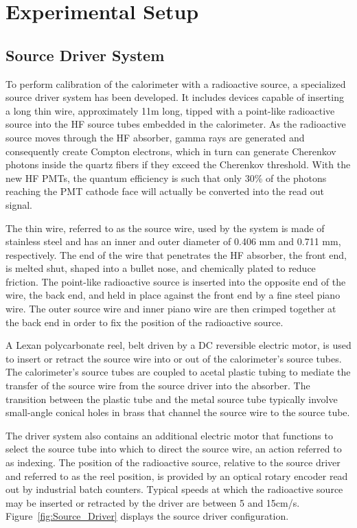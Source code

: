 \section{Experimental Setup}

\subsection{Source Driver System}
To perform calibration of the calorimeter with a radioactive source, a
specialized source driver system has been developed. It includes devices capable of
inserting a long thin wire, approximately 11\unit{m} long, tipped with a point-like
radioactive source into the HF source tubes embedded in the calorimeter. As the
radioactive source moves through the HF absorber, gamma rays are generated and
consequently create Compton electrons, which in turn can generate
Cherenkov photons inside the quartz fibers if they exceed the Cherenkov threshold.
With the new HF PMTs, the quantum efficiency is such that only 30\% of the photons
reaching the PMT cathode face will actually be converted into the read out signal.

The thin wire, referred to as the source wire, used by the system is made of
stainless steel and has an inner and outer diameter of 0.406 mm and 0.711 mm,
respectively. The end of the wire that penetrates the HF absorber, the front end,
is melted shut, shaped into a bullet nose, and chemically plated to reduce friction.
The point-like radioactive source is inserted into the opposite end of
the wire, the back end, and held in place against the front end by a fine steel
piano wire. The outer source wire and inner piano wire are then crimped together at
the back end in order to fix the position of the radioactive source.

A Lexan polycarbonate reel, belt driven by a DC reversible electric motor, is used
to insert or retract the source wire into or out of the calorimeter's source tubes.
The calorimeter's source tubes are coupled to acetal plastic tubing to mediate the
transfer of the source wire from the source driver into the absorber. The
transition between the plastic tube and the metal source tube typically involve
small-angle conical holes in brass that channel the source wire to the source tube.

The driver system also contains an additional electric motor that functions to
select the source tube into which to direct the source wire, an action referred
to as indexing. The position of the radioactive source, relative to the source
driver and referred to as the reel position, is provided by an optical rotary
encoder read out by industrial batch counters. Typical speeds at which the
radioactive source may be inserted or retracted by the driver are between 5 and
15\unit{cm/s}. Figure~\ref{fig:Source_Driver} displays the source driver configuration.

